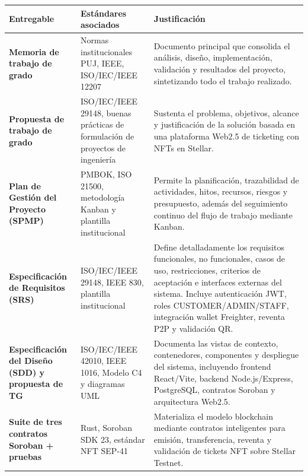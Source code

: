 \begin{table}[H]
\centering
\scriptsize
\renewcommand{\arraystretch}{1.2}
\setlength{\tabcolsep}{4pt}

\begin{tabular}{|p{3.5cm}|p{4cm}|p{7cm}|}
\hline
\textbf{Entregable} & \textbf{Estándares asociados} & \textbf{Justificación} \\ \hline

\textbf{Memoria de trabajo de grado} &
Normas institucionales PUJ, IEEE, ISO/IEC/IEEE 12207 &
Documento principal que consolida el análisis, diseño, implementación, validación y resultados del proyecto, sintetizando todo el trabajo realizado. \\ \hline

\textbf{Propuesta de trabajo de grado} &
ISO/IEC/IEEE 29148, buenas prácticas de formulación de proyectos de ingeniería &
Sustenta el problema, objetivos, alcance y justificación de la solución basada en una plataforma Web2.5 de ticketing con NFTs en Stellar. \\ \hline

\textbf{Plan de Gestión del Proyecto (SPMP)} &
PMBOK, ISO 21500, metodología Kanban y plantilla institucional &
Permite la planificación, trazabilidad de actividades, hitos, recursos, riesgos y presupuesto, además del seguimiento continuo del flujo de trabajo mediante Kanban. \\ \hline

\textbf{Especificación de Requisitos (SRS)} &
ISO/IEC/IEEE 29148, IEEE 830, plantilla institucional &
Define detalladamente los requisitos funcionales, no funcionales, casos de uso, restricciones, criterios de aceptación e interfaces externas del sistema. Incluye autenticación JWT, roles CUSTOMER/ADMIN/STAFF, integración wallet Freighter, reventa P2P y validación QR. \\ \hline

\textbf{Especificación del Diseño (SDD) y propuesta de TG} &
ISO/IEC/IEEE 42010, IEEE 1016, Modelo C4 y diagramas UML &
Documenta las vistas de contexto, contenedores, componentes y despliegue del sistema, incluyendo frontend React/Vite, backend Node.js/Express, PostgreSQL, contratos Soroban y arquitectura Web2.5. \\ \hline

\textbf{Suite de tres contratos Soroban + pruebas} &
Rust, Soroban SDK 23, estándar NFT SEP-41 &
Materializa el modelo blockchain mediante contratos inteligentes para emisión, transferencia, reventa y validación de tickets NFT sobre Stellar Testnet. \\ \hline


\end{tabular}
\end{table}
